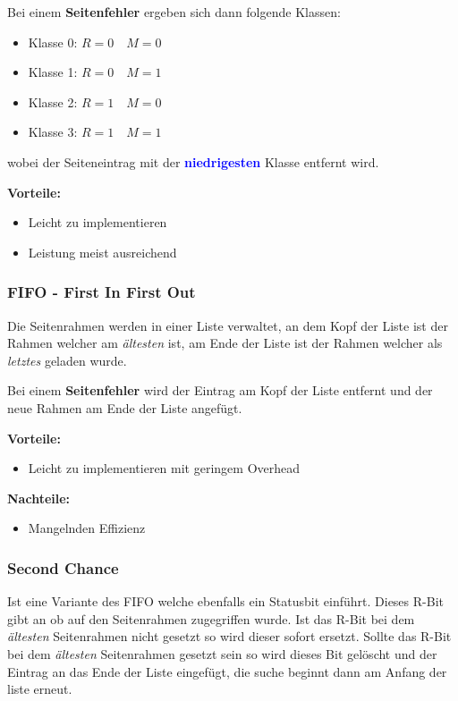 \documentclass[10pt,a4paper]{article}
\begin{document}
\begin{multicols*}{4}
Bei einem \textbf{Seitenfehler} ergeben sich dann folgende Klassen:
\begin{itemize}
	\item Klasse 0: \(R=0 \quad M=0\)
	\item Klasse 1: \(R=0 \quad M=1\)
	\item Klasse 2: \(R=1 \quad M=0\)
	\item Klasse 3: \(R=1 \quad M=1\)
\end{itemize}
wobei der Seiteneintrag mit der \textcolor{blue}{\bf niedrigesten} Klasse entfernt wird.

\textbf{\small Vorteile:}\hfill
\begin{itemize}
	\item Leicht zu implementieren
	\item Leistung meist ausreichend
\end{itemize}

\subsubsection*{FIFO - First In First Out}
Die Seitenrahmen werden in einer Liste verwaltet, an dem Kopf der Liste ist der Rahmen welcher am \textit{ältesten} ist,
am Ende der Liste ist der Rahmen welcher als \textit{letztes} geladen wurde.

Bei einem \textbf{Seitenfehler} wird der Eintrag am Kopf der Liste entfernt und der neue Rahmen am Ende der Liste
angefügt.

\textbf{\small Vorteile:}\hfill
\begin{itemize}
	\item Leicht zu implementieren mit geringem Overhead
\end{itemize}

\textbf{\small Nachteile:}\hfill
\begin{itemize}
	\item Mangelnden Effizienz
\end{itemize}

\subsubsection*{Second Chance}
Ist eine Variante des FIFO welche ebenfalls ein Statusbit einführt. Dieses R-Bit gibt an ob auf den Seitenrahmen
zugegriffen wurde. Ist das R-Bit bei dem \textit{ältesten} Seitenrahmen nicht gesetzt so wird dieser sofort ersetzt.
Sollte das R-Bit bei dem \textit{ältesten} Seitenrahmen gesetzt sein so wird dieses Bit gelöscht und der Eintrag an das
Ende der Liste eingefügt, die suche beginnt dann am Anfang der liste erneut.


\end{multicols*}
\end{document}
